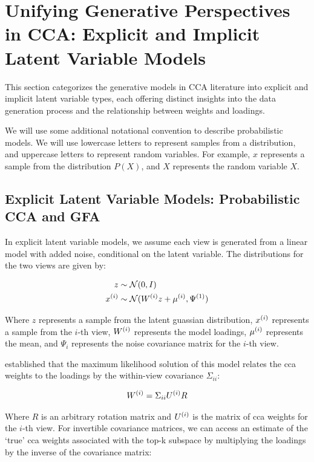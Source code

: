 \section{Unifying Generative Perspectives in CCA: Explicit and Implicit Latent Variable Models}

This section categorizes the generative models in CCA literature into explicit and implicit latent variable types, each offering distinct insights into the data generation process and the relationship between weights and loadings.

We will use some additional notational convention to describe probabilistic models.
We will use lowercase letters to represent samples from a distribution, and uppercase letters to represent random variables.
For example, \(x\) represents a sample from the distribution \(P(X)\), and \(X\) represents the random variable \(X\).

\subsection{Explicit Latent Variable Models: Probabilistic CCA and GFA}

In explicit latent variable models, we assume each view is generated from a linear model with added noise, conditional on the latent variable.
The distributions for the two views are given by:

\begin{align}
    z &\sim \mathcal{N}(0, I)\\
    x^{(i)} &\sim \mathcal{N}(W^{(i)} z + \mu^{(i)}, \Psi^{(1)})
\end{align}

Where \(z\) represents a sample from the latent guassian distribution, \(x^{(i)}\) represents a sample from the \(i\)-th view, \(W^{(i)}\) represents the model loadings, \(\mu^{(i)}\) represents the mean, and \(\Psi_{i}\) represents the noise covariance matrix for the \(i\)-th view.

\citet{bach2005probabilistic} established that the maximum likelihood solution of this model relates the \acrshort{cca} weights to the loadings by the within-view covariance \(\Sigma_{ii}\):

\begin{align}\label{eq:weights-to-loadings}
    W^{(i)} = \Sigma_{ii} U^{(i)} R
\end{align}

Where \(R\) is an arbitrary rotation matrix and \(U^{(i)}\) is the matrix of \acrshort{cca} weights for the \(i\)-th view.
For invertible covariance matrices, we can access an estimate of the `true' \acrshort{cca} weights associated with the top-k subspace by multiplying the loadings by the inverse of the covariance matrix:

